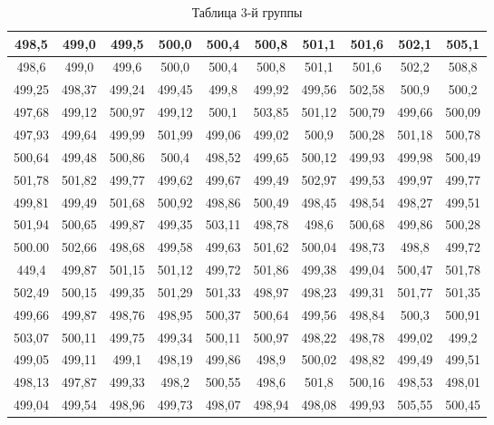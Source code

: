 \documentclass[12pt]{article}
\begin{document}
    \begin{table}[H]
        \centering
        \caption{Таблица 3-й группы}
        \begin{tabular}{|c|c|c|c|c|c|c|c|c|c|}
        \hline
        498,5  & 499,0  & 499,5  & 500,0  & 500,4  & 500,8  & 501,1  & 501,6  & 502,1  & 505,1  \\ \hline
        498,6  & 499,0  & 499,6  & 500,0  & 500,4  & 500,8  & 501,1  & 501,6  & 502,2  & 508,8  \\ \hline
        499,25 & 498,37 & 499,24 & 499,45 & 499,8  & 499,92 & 499,56 & 502,58 & 500,9  & 500,2  \\ \hline
        497,68 & 499,12 & 500,97 & 499,12 & 500,1  & 503,85 & 501,12 & 500,79 & 499,66 & 500,09 \\ \hline
        497,93 & 499,64 & 499,99 & 501,99 & 499,06 & 499,02 & 500,9  & 500,28 & 501,18 & 500,78 \\ \hline
        500,64 & 499,48 & 500,86 & 500,4  & 498,52 & 499,65 & 500,12 & 499,93 & 499,98 & 500,49 \\ \hline
        501,78 & 501,82 & 499,77 & 499,62 & 499,67 & 499,49 & 502,97 & 499,53 & 499,97 & 499,77 \\ \hline
        499,81 & 499,49 & 501,68 & 500,92 & 498,86 & 500,49 & 498,45 & 498,54 & 498,27 & 499,51 \\ \hline
        501,94 & 500,65 & 499,87 & 499,35 & 503,11 & 498,78 & 498,6  & 500,68 & 499,86 & 500,28 \\ \hline
        500.00 & 502,66 & 498,68 & 499,58 & 499,63 & 501,62 & 500,04 & 498,73 & 498,8  & 499,72 \\ \hline
        449,4  & 499,87 & 501,15 & 501,12 & 499,72 & 501,86 & 499,38 & 499,04 & 500,47 & 501,78 \\ \hline
        502,49 & 500,15 & 499,35 & 501,29 & 501,33 & 498,97 & 498,23 & 499,31 & 501,77 & 501,35 \\ \hline
        499,66 & 499,87 & 498,76 & 498,95 & 500,37 & 500,64 & 499,56 & 498,84 & 500,3  & 500,91 \\ \hline
        503,07 & 500,11 & 499,75 & 499,34 & 500,11 & 500,97 & 498,22 & 498,78 & 499,02 & 499,2  \\ \hline
        499,05 & 499,11 & 499,1  & 498,19 & 499,86 & 498,9  & 500,02 & 498,82 & 499,49 & 499,51 \\ \hline
        498,13 & 497,87 & 499,33 & 498,2  & 500,55 & 498,6  & 501,8  & 500,16 & 498,53 & 498,01 \\ \hline
        499,04 & 499,54 & 498,96 & 499,73 & 498,07 & 498,94 & 498,08 & 499,93 & 505,55 & 500,45 \\ \hline

\end{tabular}
\end{table}
\end{document}
